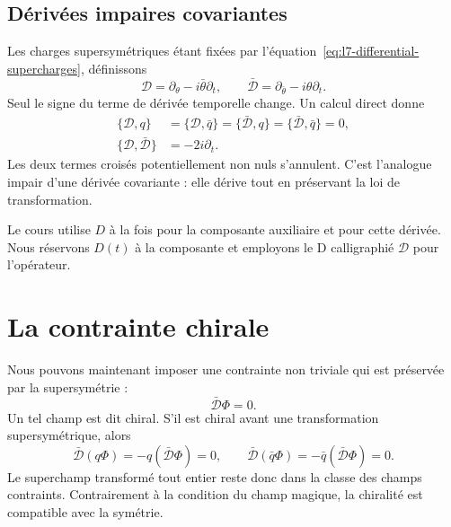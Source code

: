\begin{classroomqa}
\end{classroomqa}

\subsection{Dérivées impaires covariantes}

Les charges supersymétriques étant fixées par l’équation~\eqref{eq:l7-differential-supercharges}, définissons
\begin{equation}
\mathcal D=\partial_\theta-i\bar\theta\partial_t,
\qquad
\bar{\mathcal D}=\partial_{\bar\theta}-i\theta\partial_t.
\label{eq:l7-covariant-derivatives}
\end{equation}
Seul le signe du terme de dérivée temporelle change. Un calcul direct donne
\begin{align}
\{\mathcal D,q\}
&=\{\mathcal D,\bar q\}
=\{\bar{\mathcal D},q\}
=\{\bar{\mathcal D},\bar q\}=0,\\
\{\mathcal D,\bar{\mathcal D}\}&=-2i\partial_t.
\label{eq:l7-covariant-algebra}
\end{align}
Les deux termes croisés potentiellement non nuls s’annulent. C’est l’analogue impair d’une dérivée covariante : elle dérive tout en préservant la loi de transformation.

Le cours utilise \(D\) à la fois pour la composante auxiliaire et pour cette dérivée. Nous réservons \(D(t)\) à la composante et employons le D calligraphié \(\mathcal D\) pour l’opérateur.

\section{La contrainte chirale}

Nous pouvons maintenant imposer une contrainte non triviale qui est préservée par la supersymétrie :
\begin{equation}
\bar{\mathcal D}\Phi=0.
\label{eq:l7-chiral-constraint}
\end{equation}
Un tel champ est dit chiral. S’il est chiral avant une transformation supersymétrique, alors
\begin{equation}
\bar{\mathcal D}(q\Phi)
=-q(\bar{\mathcal D}\Phi)=0,
\qquad
\bar{\mathcal D}(\bar q\Phi)
=-\bar q(\bar{\mathcal D}\Phi)=0.
\end{equation}
Le superchamp transformé tout entier reste donc dans la classe des champs contraints. Contrairement à la condition du champ magique, la chiralité est compatible avec la symétrie.

